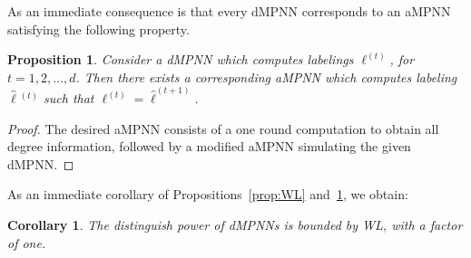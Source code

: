 \documentclass[10pt,a4paper]{article}
\newtheorem{proposition}{Proposition}[section]
\newtheorem{corollary}[theorem]{Corollary}
\theoremstyle{definition}
\begin{document}
As an immediate consequence is that every dMPNN corresponds to an aMPNN satisfying the following property.
\begin{proposition}\label{prop:onestep}
Consider a dMPNN which computes labelings $\pmb{\ell}^{(t)}$, for $t=1,2,\ldots,d$. Then there exists a corresponding aMPNN which computes labeling $\hat{\pmb{\ell}}{}^{(t)}$ such that $\pmb{\ell}^{(t)}=\hat{\pmb{\ell}}^{(t+1)}$.
\end{proposition}
\begin{proof}
	The desired aMPNN consists of a one round computation to obtain all degree information, followed by a modified aMPNN simulating the given dMPNN.
\end{proof}

As an immediate corollary of Propositions~\ref{prop:WL} and~\ref{prop:onestep},  we obtain:
\begin{corollary}
	The distinguish power of dMPNNs is bounded by WL, with a factor of one.
\end{corollary}

%

%
%
%
%
%
\end{document}
